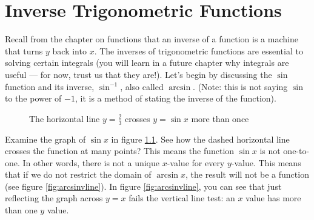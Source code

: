 \chapter{Inverse Trigonometric Functions}

Recall from the chapter on functions that an inverse of a function is a machine that turns $y$ back into $x$. The inverses of trigonometric functions are essential to solving certain integrals (you will learn in a future chapter why integrals are useful --- for now, trust us that they are!). Let's begin by discussing the $\sin$ function and its inverse, $\sin^{-1}$, also called $\arcsin$. (Note: this is not saying $\sin$ to the power of $-1$, it is a method of stating the inverse of the function).

\begin{center}
	\begin{figure}
	\centering
		\caption{The horizontal line $y=\frac{2}{3}$ crosses $y = \sin{x}$ more than once}
		\label{fig:sinhline}
	\end{figure}
\end{center}

Examine the graph of $\sin{x}$ in figure \ref{fig:sinhline}. See how the dashed horizontal line crosses the function at many points? This means the function $\sin{x}$ is not one-to-one. In other words, there is not a unique $x$-value for every $y$-value. This means that if we do not restrict the domain of $\arcsin{x}$, the result will not be a function (see figure \ref{fig:arcsinvline}). In figure \ref{fig:arcsinvline}, you can see that just reflecting the graph across $y=x$ fails the vertical line test: an $x$ value has more than one $y$ value.

